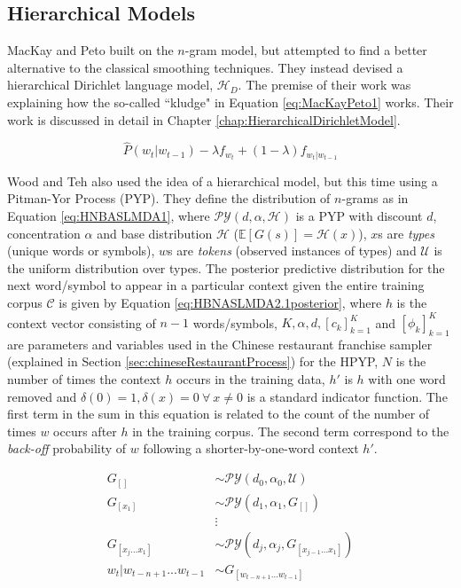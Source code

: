 \subsection{Hierarchical Models}

MacKay and Peto \cite{mackay1995hierarchical} built on the $n$-gram model, but attempted to find a better alternative to the classical smoothing techniques. They instead devised a hierarchical Dirichlet language model, $\mathscr{H}_{D}$. The premise of their work was explaining how the so-called ``kludge" in Equation \ref{eq:MacKayPeto1} works. Their work is discussed in detail in Chapter \ref{chap:HierarchicalDirichletModel}.



\begin{equation}
\hat{P}(w_{t}|w_{t-1})-\lambda f_{w_{t}}+(1-\lambda)f_{w_{t}|w_{t-1}}
\label{eq:MacKayPeto1}
\end{equation}




Wood and Teh \cite{wood2009hierarchical} also used the idea of a hierarchical model, but this time using a Pitman-Yor Process (PYP). They define the distribution of $n$-grams as in Equation \ref{eq:HNBASLMDA1}, where $\mathcal{PY}(d,\alpha,\mathcal{H})$ is a PYP with discount $d$, concentration $\alpha$ and base distribution $\mathcal{H}$ ($\mathbb{E}[G(s)]=\mathcal{H}(x)$), $x$s are \textit{types} (unique words or symbols), $w$s are \textit{tokens} (observed instances of types) and $\mathcal{U}$ is the uniform distribution over types. The posterior predictive distribution for the next word/symbol to appear in a particular context given the entire training corpus $\mathcal{C}$ is given by Equation \ref{eq:HBNASLMDA2.1posterior}, where $h$ is the context vector consisting of $n-1$ words/symbols, $K,\alpha,d,[c_{k}]_{k=1}^{K}$ and $[\phi_{k}]_{k=1}^{K}$ are parameters and variables used in the Chinese restaurant franchise sampler (explained in Section \ref{sec:chineseRestaurantProcess}) for the HPYP, $N$ is the number of times the context $h$ occurs in the training data, $h'$ is $h$ with one word removed and $\delta(0)=1,\delta(x)=0\ \forall\ x\neq0$ is a standard indicator function. The first term in the sum in this equation is related to the count of the number of times $w$ occurs after $h$ in the training corpus. The second term correspond to the \textit{back-off} probability of $w$ following a shorter-by-one-word context $h'$.

\begin{align}
G_{[]}&\sim\mathcal{PY}(d_{0},\alpha_{0},\mathcal{U}) \nonumber
\\
G_{[x_{1}]}&\sim\mathcal{PY}(d_{1},\alpha_{1},G_{[]}) \nonumber
\\
&\vdots\nonumber 
\\
G_{[x_{j}...x_{1}]}&\sim\mathcal{PY}(d_{j},\alpha_{j},G_{[x_{j-1}...x_{1}]}) \nonumber
\\
w_{t}|w_{t-n+1}...w_{t-1}&\sim G_{[w_{t-n+1}...w_{t-1}]} 
\label{eq:HNBASLMDA1}
\end{align}


